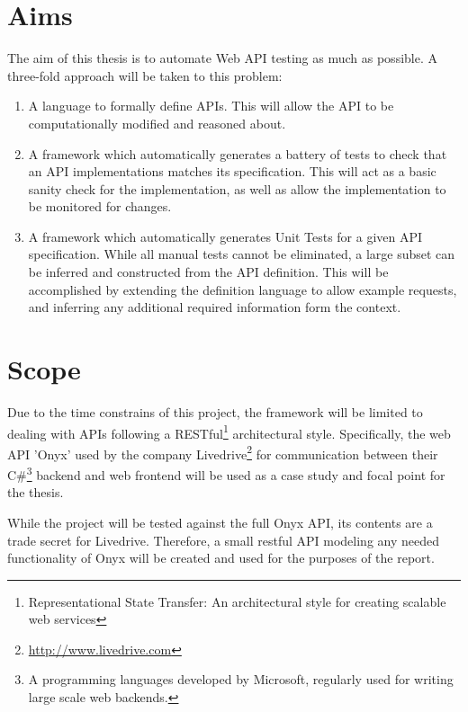 \section{Aims}
The aim of this thesis is to automate Web API testing as much as possible. A three-fold approach will be taken to this problem:
\begin{enumerate}
  \item A language to formally define APIs. This will allow the API to be computationally modified and reasoned about.
  \item A framework which automatically generates a battery of tests to check that an API implementations matches its specification. This will act as a basic sanity check for the implementation, as well as allow the implementation to be monitored for changes.
  \item A framework which automatically generates Unit Tests for a given API specification. While all manual tests cannot be eliminated, a large subset can be inferred and constructed from the API definition. This will be accomplished by extending the definition language to allow example requests, and inferring any additional required information form the context. 
\end{enumerate}

\section{Scope}
Due to the time constrains of this project, the framework will be limited to dealing with APIs following a RESTful\footnote{Representational State Transfer: An architectural style for creating scalable web services} architectural style. Specifically, the web API 'Onyx' used by the company Livedrive\footnote{\url{http://www.livedrive.com}} for communication between their C\#\footnote{A programming languages developed by Microsoft, regularly used for writing large scale web backends.} backend and web frontend will be used as a case study and focal point for the thesis.

While the project will be tested against the full Onyx API, its contents are a trade secret for Livedrive. Therefore, a small restful API modeling any needed functionality of Onyx will be created and used for the purposes of the report.